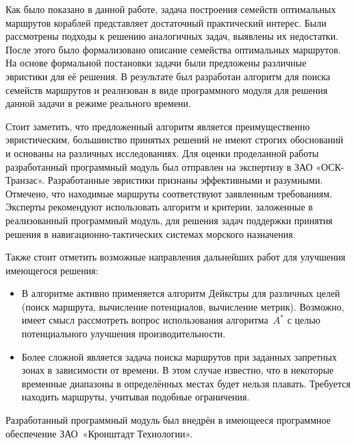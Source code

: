 
Как было показано в данной работе, задача построения семейств
оптимальных маршрутов кораблей представляет достаточный практический
интерес. Были рассмотрены подходы к решению аналогичных задач,
выявлены их недостатки. После этого было формализовано описание
семейства оптимальных маршрутов. На основе формальной постановки
задачи были предложены различные эвристики для её решения. В
результате был разработан алгоритм для поиска семейств маршрутов и
реализован в виде программного модуля для решения данной задачи в
режиме реального времени.

Стоит заметить, что предложенный алгоритм является преимущественно
эвристическим, большинство принятых решений не имеют строгих
обоснований и основаны на различных исследованиях. Для оценки
проделанной работы разработанный программный модуль был отправлен на
экспертизу в ЗАО «ОСК-Транзас». Разработанные эвристики признаны
эффективными и разумными. Отмечено, что находимые маршруты
соответствуют заявленным требованиям. Эксперты рекомендуют
использовать алгоритм и критерии, заложенные в реализованный
программный модуль, для решения задач поддержки принятия решения в
навигационно-тактических системах морского назначения.

Также стоит отметить возможные направления дальнейших работ для
улучшения имеющегося решения:
\begin{itemize}
    \item В алгоритме активно применяется алгоритм Дейкстры для различных
      целей (поиск маршрута, вычисление потенциалов, вычисление метрик).
      Возможно, имеет смысл рассмотреть вопрос использования
      алгоритма~$A^*$ с целью потенциального улучшения производительности.
    \item Более сложной является задача поиска маршрутов при заданных
      запретных зонах в зависимости от времени. В этом случае
      известно, что в некоторые временные диапазоны в определённых
      местах будет нельзя плавать. Требуется находить маршруты,
      учитывая подобные ограничения.
\end{itemize}

Разработанный программный модуль был внедрён в имеющееся программное
обеспечение ЗАО~«Кронштадт Технологии».

\FloatBarrier
